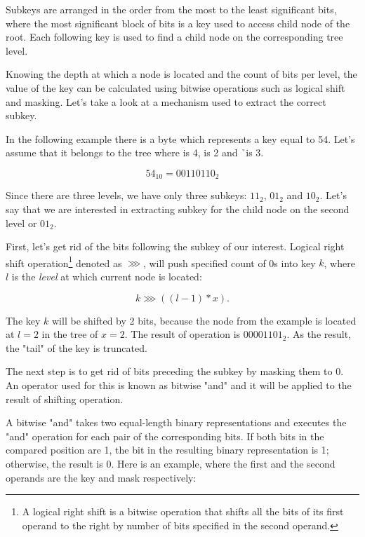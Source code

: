 Subkeys are arranged in the order from the most to the least significant bits, where the most significant block of bits is a key used to access child node of the root. Each following key is used to find a child node on the corresponding tree level.

Knowing the depth at which a node is located and the count of bits per level, the value of the key can be calculated using bitwise operations such as logical shift and masking. Let's take a look at a mechanism used to extract the correct subkey.

In the following example there is a byte which represents a key equal to 54. Let's assume that it belongs to the tree where \m{} is 4, \x{} is 2 and \h\ is 3.

\begin{equation}
    54_{10} = 00110110_2
\end{equation}

Since there are three levels, we have only three subkeys: $11_2$, $01_2$ and $10_2$. Let's say that we are interested in extracting subkey for the child node on the second level or $01_2$.

First, let's get rid of the bits following the subkey of our interest. Logical right shift operation\footnote{A logical right shift is a bitwise operation that shifts all the bits of its first operand to the right by number of bits specified in the second operand.} denoted as $\ggg$, will push specified count of 0s into key $k$, where $l$ is the \emph{level} at which current node is located:

\begin{equation}
    k \ggg ((l - 1) * x).
\end{equation}

The key $k$ will be shifted by 2 bits, because the node from the example is located at $l = 2$ in the tree of $x = 2$. The result of operation is $00001101_2$. As the result, the "tail" of the key is truncated.

The next step is to get rid of bits preceding the subkey by masking them to 0. An operator used for this is known as bitwise "and" and it will be applied to the result of shifting operation.

A bitwise "and" takes two equal-length binary representations and executes the "and" operation for each pair of the corresponding bits. If both bits in the compared position are 1, the bit in the resulting binary representation is 1; otherwise, the result is 0. Here is an example, where the first and the second operands are the key and mask respectively:

